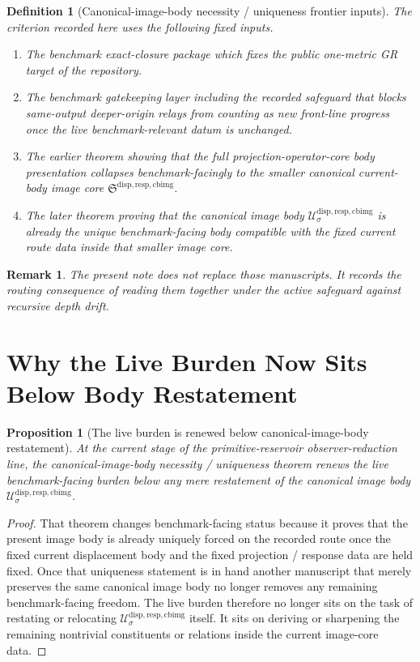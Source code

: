 \documentclass[11pt]{article}
\newcommand{\CurrentBodyImageCore}{\mathfrak S^{\mathrm{disp,resp,cbimg}}}
\newcommand{\CanonicalImageBody}[1]{\mathcal U_{#1}^{\mathrm{disp,resp,cbimg}}}
\newtheorem{definition}{Definition}
\newtheorem{proposition}{Proposition}
\newtheorem{remark}{Remark}
\begin{document}
\begin{definition}[Canonical-image-body necessity / uniqueness frontier inputs]
The criterion recorded here uses the following fixed inputs.
\begin{enumerate}
    \item The benchmark exact-closure package which fixes the public one-metric GR target of the repository.
    \item The benchmark gatekeeping layer including the recorded safeguard that blocks same-output deeper-origin relays from counting as new front-line progress once the live benchmark-relevant datum is unchanged.
    \item The earlier theorem showing that the full projection-operator-core body presentation collapses benchmark-facingly to the smaller canonical current-body image core \(\CurrentBodyImageCore\).
    \item The later theorem proving that the canonical image body \(\CanonicalImageBody{\sigma}\) is already the unique benchmark-facing body compatible with the fixed current route data inside that smaller image core.
\end{enumerate}
\end{definition}

\begin{remark}
The present note does not replace those manuscripts. It records the routing consequence of reading them together under the active safeguard against recursive depth drift.
\end{remark}

\section{Why the Live Burden Now Sits Below Body Restatement}

\begin{proposition}[The live burden is renewed below canonical-image-body restatement]
At the current stage of the primitive-reservoir observer-reduction line, the canonical-image-body necessity / uniqueness theorem renews the live benchmark-facing burden below any mere restatement of the canonical image body \(\CanonicalImageBody{\sigma}\).
\end{proposition}

\begin{proof}
That theorem changes benchmark-facing status because it proves that the present image body is already uniquely forced on the recorded route once the fixed current displacement body and the fixed projection / response data are held fixed. Once that uniqueness statement is in hand another manuscript that merely preserves the same canonical image body no longer removes any remaining benchmark-facing freedom. The live burden therefore no longer sits on the task of restating or relocating \(\CanonicalImageBody{\sigma}\) itself. It sits on deriving or sharpening the remaining nontrivial constituents or relations inside the current image-core data.
\end{proof}
\end{document}
